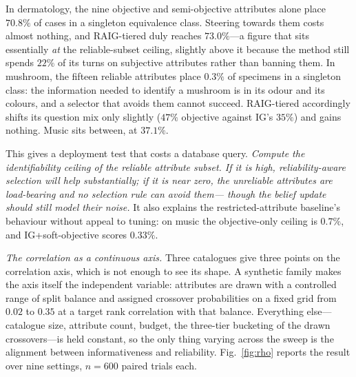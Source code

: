 In dermatology, the nine objective and semi-objective attributes alone place
$70.8\%$ of cases in a singleton equivalence class. Steering towards them costs
almost nothing, and RAIG-tiered duly reaches $73.0\%$---a figure that sits
essentially \emph{at} the reliable-subset ceiling, slightly above it because the
method still spends $22\%$ of its turns on subjective attributes rather than
banning them. In mushroom, the fifteen reliable attributes place $0.3\%$ of
specimens in a singleton class: the information needed to identify a mushroom
is in its odour and its colours, and a selector that avoids them cannot
succeed. RAIG-tiered accordingly shifts its question mix only slightly ($47\%$
objective against IG's $35\%$) and gains nothing. Music sits between, at
$37.1\%$.

This gives a deployment test that costs a database query. \emph{Compute the
identifiability ceiling of the reliable attribute subset. If it is high,
reliability-aware selection will help substantially; if it is near zero, the
unreliable attributes are load-bearing and no selection rule can avoid them---
though the belief update should still model their noise.} It also explains the
restricted-attribute baseline's behaviour without appeal to tuning: on music the
objective-only ceiling is $0.7\%$, and IG+soft-objective scores $0.33\%$.

\emph{The correlation as a continuous axis.} Three catalogues give three points
on the correlation axis, which is not enough to see its shape. A synthetic
family makes the axis itself the independent variable: attributes are drawn
with a controlled range of split balance and assigned crossover probabilities
on a fixed grid from $0.02$ to $0.35$ at a target rank correlation with that
balance. Everything else---catalogue size, attribute count, budget, the
three-tier bucketing of the drawn crossovers---is held constant, so the only
thing varying across the sweep is the alignment between informativeness and
reliability. Fig.~\ref{fig:rho} reports the result over nine settings,
$n = 600$ paired trials each.

